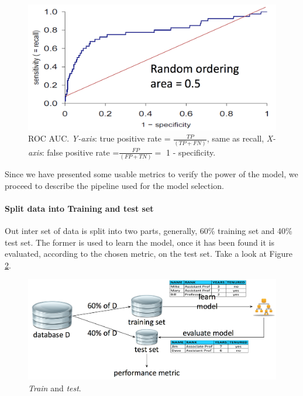 \begin{figure}[H]%
 \centering
 \includegraphics[width=13cm]{./img/08/roc}
 \caption{\label{pic:roc} ROC AUC. \emph{Y-axis}: true positive rate = $\frac{TP}{(TP + FN)}$, same as recall, \emph{X-axis}: false positive rate =$\frac{FP}{(FP + TN)} =$ 1 - specificity.}
\end{figure}

Since we have presented some usable metrics to verify the power of the model, we proceed to describe the pipeline used for the model selection.

\paragraph{Split data into Training and test set}

Out inter set of data is split into two parts, generally, 60\% training set and 40\% test set. The former is used to learn the model, once it has been found it is evaluated, according to the chosen metric, on the test set. Take a look at Figure \ref{pic:train_test}.

\begin{figure}[H]%
 \centering
 \includegraphics[width=13cm]{./img/08/train_test}
 \caption{\label{pic:train_test} \emph{Train} and \emph{test}.}
\end{figure}

